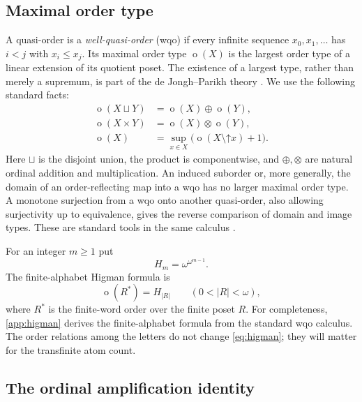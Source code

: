 \documentclass[11pt,letterpaper]{article}
\theoremstyle{definition}
\theoremstyle{remark}
\newcommand{\otp}{\operatorname{o}}
\newcommand{\up}{\mathord{\uparrow}}
\newcommand{\natprod}{\mathbin{\otimes}}
\newcommand{\natsum}{\mathbin{\oplus}}
\begin{document}
\subsection{Maximal order type}

A quasi-order is a \emph{well-quasi-order} (wqo) if every infinite sequence
$x_0,x_1,\ldots$ has $i<j$ with $x_i\le x_j$. Its maximal order type
$\otp(X)$ is the largest order type of a linear extension of its quotient
poset. The existence of a largest type, rather than merely a supremum,
is part of the de Jongh--Parikh theory \cite{deJonghParikh}.
We use the following standard facts:
\begin{equation}\label{eq:wqocalculus}
\begin{aligned}
  \otp(X\sqcup Y)&=\otp(X)\natsum\otp(Y),\\
  \otp(X\times Y)&=\otp(X)\natprod\otp(Y),\\
  \otp(X)&=\sup_{x\in X}\bigl(\otp(X\setminus\up x)+1\bigr).
\end{aligned}
\end{equation}
Here $\sqcup$ is the disjoint union, the product is componentwise, and
$\oplus,\otimes$ are natural ordinal addition and multiplication.
An induced suborder or, more generally, the domain of an order-reflecting
map into a wqo has no larger maximal order type. A monotone surjection
from a wqo onto another quasi-order, also allowing surjectivity up to
equivalence, gives the reverse comparison of domain and image types.
These are standard tools in the same calculus \cite{deJonghParikh,Schmidt}.

For an integer $m\ge1$ put
\begin{equation}\label{eq:h}
  H_m=\omega^{\omega^{m-1}}.
\end{equation}
The finite-alphabet Higman formula is
\begin{equation}\label{eq:higman}
  \otp(R^*)=H_{|R|}\qquad(0<|R|<\omega),
\end{equation}
where $R^*$ is the finite-word order over the finite poset $R$.
For completeness, \cref{app:higman} derives the finite-alphabet formula
from the standard wqo calculus. The order relations among the letters do
not change \eqref{eq:higman}; they will matter for the transfinite atom count.

\subsection{The ordinal amplification identity}
\end{document}
